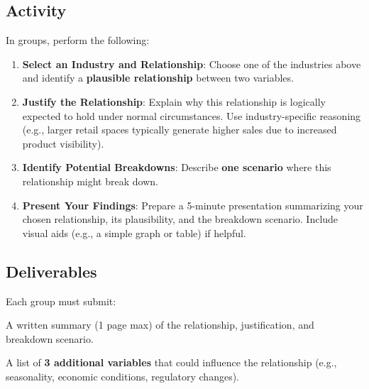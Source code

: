 \documentclass[12pt,a4paper]{memoir}
\begin{document}
\subsection*{Activity}
In groups, perform the following:
\begin{enumerate}
    \item \textbf{Select an Industry and Relationship}:
    Choose one of the industries above and identify a \textbf{plausible relationship} between two variables. 

    \item \textbf{Justify the Relationship}:
    Explain why this relationship is logically expected to hold under normal circumstances. Use industry-specific reasoning (e.g., larger retail spaces typically generate higher sales due to increased product visibility).

    \item \textbf{Identify Potential Breakdowns}:
    Describe \textbf{one scenario} where this relationship might break down. 

    \item \textbf{Present Your Findings}:
    Prepare a 5-minute presentation summarizing your chosen relationship, its plausibility, and the breakdown scenario. Include visual aids (e.g., a simple graph or table) if helpful.
\end{enumerate}

\subsection*{Deliverables}
Each group must submit:
\begin{compactitem}
    \item A written summary (1 page max) of the relationship, justification, and breakdown scenario.
    \item A list of \textbf{3 additional variables} that could influence the relationship (e.g., seasonality, economic conditions, regulatory changes).
\end{compactitem}
\end{document}
